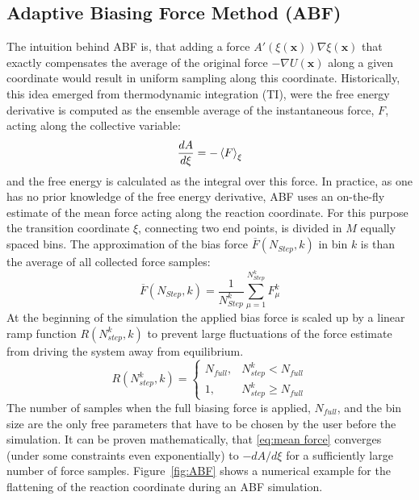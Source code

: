 \newpage
\subsection{Adaptive Biasing Force Method (ABF)}
\label{sec:ABF}

The intuition behind ABF is, that adding a force $A'(\xi(\textbf{x}))\nabla\xi(\textbf{x})$ that exactly compensates the average of the original force $-\nabla U(\textbf{x})$ along a given coordinate would result in uniform sampling along this coordinate.\autocite{comer2015adaptive}
Historically, this idea emerged from thermodynamic integration (TI), were the free energy derivative  is computed as the ensemble average of the instantaneous force, $F$, acting along the collective variable:
\begin{equation}
\frac{dA}{d\xi} = -\braket{F}_{\xi}
\end{equation}
and the free energy is calculated as the integral over this force.\autocite{kirkwood1935statistical,zwanzig1954high}
In practice, as one has no prior knowledge of the free energy derivative, ABF uses an on-the-fly estimate of the mean force acting along the reaction coordinate. For this purpose the transition coordinate $\xi$, connecting two end points, is divided in $M$ equally spaced bins. The approximation of the bias force $\overline{F}(N_{Step},k)$ in bin $k$ is than the average of all collected force samples:\autocite{comer2015adaptive}
\begin{equation}
  \overline{F}(N_{Step},k) = \frac{1}{N_{Step}^{k}} \sum_{\mu=1}^{N_{Step}^{k}} F_{\mu}^{k}
  \label{eq:mean force}
\end{equation}
At the beginning of the simulation the applied bias force is scaled up by a linear ramp function $R(N_{step}^k,k)$ to prevent large fluctuations of the force estimate from driving the system away from equilibrium.
\begin{equation}
  R(N_{step}^k,k)=\left\{\begin{array}{ll} N_{full}, & N_{step}^{k} < N_{full} \\
                                         1,  & N_{step}^{k} \geq  N_{full} \end{array}\right. \label{eq:ramp}
\end{equation}
The number of samples when the full biasing force is applied, $N_{full}$, and the bin size are the only free parameters that have to be chosen by the user before the simulation.
It can be proven mathematically, that \ref{eq:mean force} converges (under some constraints even exponentially) to $-dA/d\xi$ for a sufficiently large number of force samples.\autocite{alrachid2015long}
Figure~\ref{fig:ABF} shows a numerical example for the flattening of the reaction coordinate during an ABF simulation.

